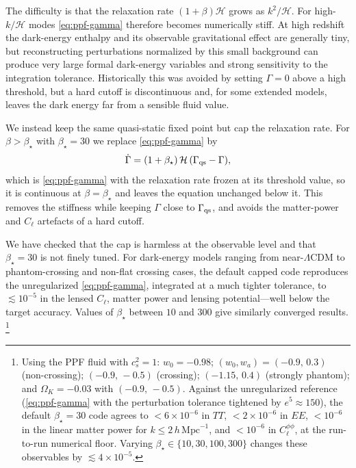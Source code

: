 \documentclass[prd, twocolumn, superscriptaddress, tightenlines, longbibliography, nofootinbib, eqsecnum, amsfonts, amsmath, floatfix, notitlepage]{revtex4-2}
\begin{document}
The difficulty is that the relaxation rate $(1+\beta)\mathcal H$ grows as
$k^2/\mathcal H$. For high-$k/\mathcal H$ modes  \cref{eq:ppf-gamma} therefore becomes
numerically stiff. At high redshift the dark-energy enthalpy and its observable
gravitational effect are generally tiny, but reconstructing perturbations
normalized by this small background can produce very large formal
dark-energy variables and strong sensitivity to the integration tolerance.
Historically this was avoided by setting $\Gamma=0$ above a
high threshold, but a hard cutoff is discontinuous and, for some extended models,
leaves the dark energy far from a sensible fluid value.

We instead keep the same quasi-static fixed point but cap the relaxation rate. For
$\beta>\beta_\star$ with $\beta_\star=30$ we replace \cref{eq:ppf-gamma} by
\begin{equation}
  \dot\Gamma=(1+\beta_\star)\,\mathcal H\,(\Gamma_{\rm qs}-\Gamma),
  \label{eq:ppf-fix}
\end{equation}
which is \cref{eq:ppf-gamma} with the relaxation rate frozen at its threshold
value, so it is continuous at $\beta=\beta_\star$ and leaves the equation
unchanged below it. This removes the stiffness while keeping $\Gamma$ close to
$\Gamma_{\rm qs}$, and avoids the matter-power and $C_\ell$ artefacts of a hard
cutoff.

We have checked that the cap is harmless at the observable level and that
$\beta_\star=30$ is not finely tuned. For dark-energy models ranging from
near-$\Lambda$CDM to phantom-crossing and non-flat crossing cases, the default
capped code reproduces the unregularized \cref{eq:ppf-gamma}, integrated at a
much tighter tolerance, to $\lesssim10^{-5}$ in the lensed $C_\ell$, matter
power and lensing potential---well below the target accuracy. Values of
$\beta_\star$ between $10$ and $300$ give similarly converged results.
\footnote{Using the PPF fluid with $c_s^2=1$: $w_0=-0.98$;
$(w_0,w_a)=(-0.9,\,0.3)$ (non-crossing);
$(-0.9,\,-0.5)$ (crossing); $(-1.15,\,0.4)$ (strongly phantom); and
$\Omega_K=-0.03$ with $(-0.9,\,-0.5)$. Against the unregularized reference
(\cref{eq:ppf-gamma} with the perturbation tolerance tightened by
$e^5\approx150$), the default $\beta_\star=30$ code agrees to
$<6\times10^{-6}$ in $TT$, $<2\times10^{-6}$ in $EE$, $<10^{-6}$ in the
linear matter power for $k\le2\,h\,\mathrm{Mpc}^{-1}$, and $<10^{-6}$ in
$C_\ell^{\phi\phi}$, at the run-to-run numerical floor. Varying
$\beta_\star\in\{10,30,100,300\}$ changes these observables by
$\lesssim4\times10^{-5}$.}
\end{document}
